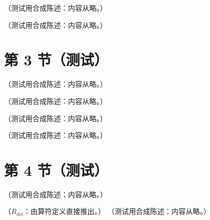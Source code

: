 \begin{remark}[$\theta$ 项]\label{rem:qcd-theta}
（测试用合成陈述：内容从略。）
\end{remark}

\begin{remark}\label{rem:qcd-fp-derivation}
（测试用合成陈述：内容从略。）
\end{remark}

\section{第 3 节（测试）}\label{sec:prelim-qcd}

\begin{definition}\label{def:qcd-fp}
（测试用合成陈述：内容从略。）
\end{definition}

\begin{example}\label{ex:qcd-fp-lowest-order}
（测试用合成陈述：内容从略。）
\end{example}

\begin{definition}[Feynman 规则]\label{def:prelim-feynman-rules}
（测试用合成陈述：内容从略。）
\end{definition}

\begin{example}\label{ex:qcd-qqbar-gg}
（测试用合成陈述：内容从略。）
\end{example}

\section{第 4 节（测试）}\label{sec:qcd-quantization}

\begin{definition}[维数正规化]\label{def:qcd-dimreg}
（测试用合成陈述：内容从略。）
\end{definition}

\begin{proposition}\label{prop:qcd-superficial-degree}
（$R_{\mathrm{def}}$：由算符定义直接推出。）
（测试用合成陈述：内容从略。）
\end{proposition}

